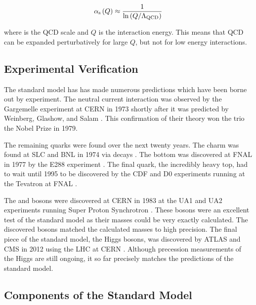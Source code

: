 \begin{equation}\label{eq:alpha_strong}
    \alpha_{\text{s}} \left( Q \right)
    \approx
    \frac{1}{
        {\mathrm{ln}} \left( Q / \Lambda_{\text{QCD}} \right)
    }
\end{equation}

where \LambdaQCD is the QCD scale and $Q$ is the interaction energy. This means
that QCD can be expanded perturbatively for large $Q$, but not for low energy
interactions.

\subsection{Experimental Verification}

The standard model has has made numerous predictions which have been borne out
by experiment. The neutral current interaction was observed by the Gargemelle
experiment at CERN in 1973 shortly after it was predicted by Weinberg, Glashow,
and Salam \cite{hasert1973}. This confirmation of their theory won the trio the
Nobel Prize in 1979.

The remaining quarks were found over the next twenty years. The charm was found
at SLC and BNL in 1974 via \jpsi decays \cite{aubert1974}\cite{augustin1974}.
The bottom was discovered at FNAL in 1977 by the E288 experiment
\cite{herb1977}. The final quark, the incredibly heavy top, had to wait until
1995 to be discovered by the CDF and D0 experiments running at the Tevatron at
FNAL \cite{cdf1995}\cite{d01995}.

The \W and \Z bosons were discovered at CERN in 1983 at the UA1 and UA2
experiments running Super Proton Synchrotron
\cite{ua1_w}\cite{ua2_w}\cite{ua1_z}\cite{ua2_z}. These bosons were an
excellent test of the standard model as their masses could be very exactly
calculated. The discovered bosons matched the calculated masses to high
precision. The final piece of the standard model, the Higgs bosons, was
discovered by ATLAS and CMS in 2012 using the LHC at CERN
\cite{atlas_higgs}\cite{cms_higgs}. Although precession measurements of the
Higgs are still ongoing, it so far precisely matches the predictions of the
standard model.

\subsection{Components of the Standard Model}

